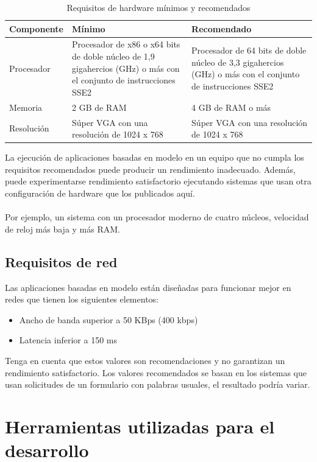 \documentclass[12pt, a4paper, titlepage]{article}
\begin{document}
	\begin{table}[!htbp]
		\caption[Requisitos hardware]{Requisitos de hardware mínimos y recomendados}
		\begin{tabular}{| p{4cm} | p{4cm} | p{4cm} |} 
			\hline
			\textbf{Componente} & \textbf{Mínimo} & \textbf{Recomendado} \\ 
			\hline
			Procesador & Procesador de x86 o x64 bits de doble núcleo de 1,9 gigahercios (GHz) o más con el conjunto de instrucciones SSE2 & Procesador de 64 bits de doble núcleo de 3,3 gigahercios (GHz) o más con el conjunto de instrucciones SSE2 \\ 
			\hline
			Memoria & 2 GB de RAM & 4 GB de RAM o más \\
			\hline
			Resolución  & Súper VGA con una resolución de 1024 x 768 & Súper VGA con una resolución de 1024 x 768 \\
			\hline
		\end{tabular}
	\end{table}
	
	
	La ejecución de aplicaciones basadas en modelo en un equipo
	que no cumpla los requisitos recomendados puede producir un
	rendimiento inadecuado. Además, puede experimentarse
	rendimiento satisfactorio ejecutando sistemas que usan otra
	configuración de hardware que los publicados aquí.\\\\
	Por ejemplo, un sistema con un procesador moderno
	de cuatro núcleos, velocidad de reloj más baja y más RAM.
	
	\subsection{Requisitos de red}
	Las aplicaciones basadas en modelo están diseñadas para funcionar
	mejor en redes que tienen los siguientes elementos:
	
	\begin{itemize}
		\item Ancho de banda superior a 50 KBps (400 kbps)
		\item Latencia inferior a 150 ms
	\end{itemize}
	
	Tenga en cuenta que estos valores son recomendaciones y no garantizan
	un rendimiento satisfactorio. Los valores recomendados se basan en los
	sistemas que usan solicitudes de un formulario con palabras usuales,
	el resultado podría variar.
	
	\section{Herramientas utilizadas para el desarrollo}
\end{document}
